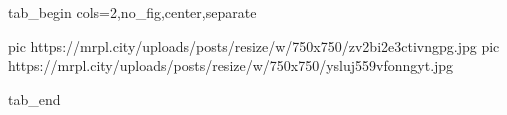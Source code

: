  
 
 
 
 

\ifcmt
  tab_begin cols=2,no_fig,center,separate

     pic https://mrpl.city/uploads/posts/resize/w/750x750/zv2bi2e3ctivngpg.jpg
		 pic https://mrpl.city/uploads/posts/resize/w/750x750/ysluj559vfonngyt.jpg

  tab_end
\fi
